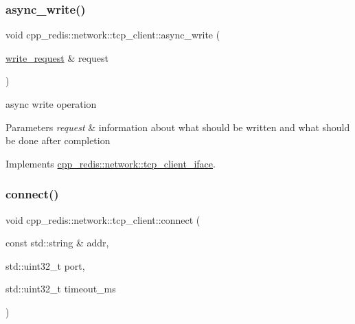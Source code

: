 \mbox{\label{classcpp__redis_1_1network_1_1tcp__client_a6d15785b71776cd85426c9634cb446f0}} 
\subsubsection{\texorpdfstring{async\+\_\+write()}{async\_write()}}
{\footnotesize\ttfamily void cpp\+\_\+redis\+::network\+::tcp\+\_\+client\+::async\+\_\+write (\begin{DoxyParamCaption}\item[{\mbox{\hyperlink{structcpp__redis_1_1network_1_1tcp__client__iface_1_1write__request}{write\+\_\+request}} \&}]{request }\end{DoxyParamCaption})\hspace{0.3cm}{\ttfamily [virtual]}}

async write operation


\begin{DoxyParams}{Parameters}
{\em request} & information about what should be written and what should be done after completion \\
\hline
\end{DoxyParams}


Implements \mbox{\hyperlink{classcpp__redis_1_1network_1_1tcp__client__iface_a9cd01e8a68479456d15d6435ffad9b92}{cpp\+\_\+redis\+::network\+::tcp\+\_\+client\+\_\+iface}}.

\mbox{\label{classcpp__redis_1_1network_1_1tcp__client_a5808c0569980d83479f755ac55a12dfb}} 
\subsubsection{\texorpdfstring{connect()}{connect()}}
{\footnotesize\ttfamily void cpp\+\_\+redis\+::network\+::tcp\+\_\+client\+::connect (\begin{DoxyParamCaption}\item[{const std\+::string \&}]{addr,  }\item[{std\+::uint32\+\_\+t}]{port,  }\item[{std\+::uint32\+\_\+t}]{timeout\+\_\+ms }\end{DoxyParamCaption})\hspace{0.3cm}{\ttfamily [virtual]}}

